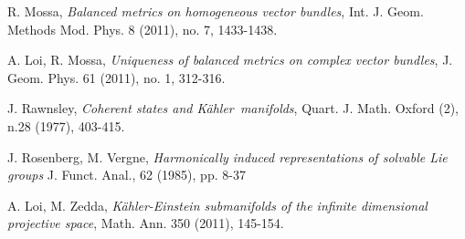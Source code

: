 \documentclass[reqno]{amsart}
\begin{document}
\begin{thebibliography}{99}
  R. Mossa,
 \emph{Balanced metrics on homogeneous vector bundles}, Int. J. Geom. Methods Mod. Phys. 8 (2011), no. 7, 1433-1438. 
 

 A. Loi, R. Mossa,
\emph{Uniqueness of balanced metrics on complex vector bundles}, J. Geom. Phys. 61 (2011), no. 1, 312-316. 

 J. Rawnsley,
\emph{ Coherent states and {K\"{a}hler}\ manifolds},
Quart. J. Math. Oxford (2), n.28 (1977), 403-415.

 J. Rosenberg, M. Vergne,
\emph{Harmonically induced representations of solvable Lie groups}
J. Funct. Anal., 62 (1985), pp. 8-37

A. Loi, M. Zedda,
\emph {{K\"{a}hler}\--Einstein submanifolds of the infinite dimensional projective space},
Math. Ann.   350 (2011), 145-154.

\end{thebibliography}
\end{document}

